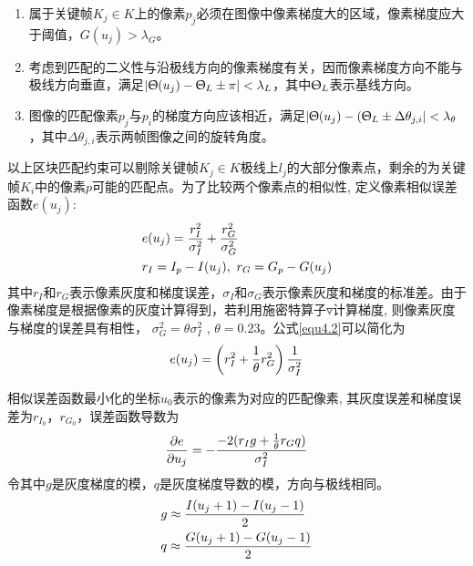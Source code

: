 \begin{enumerate}[label={(\arabic*)}]

\item 属于关键帧$K_j \in K$上的像素$p_j$必须在图像中像素梯度大的区域，像素梯度应大于阈值，$G(u_j)> \lambda_G$。

\item 考虑到匹配的二义性与沿极线方向的像素梯度有关，因而像素梯度方向不能与极线方向垂直，满足$\vert \Uptheta(u_j)-\Uptheta_L \pm \pi \vert < \lambda_L$，其中$\Uptheta_L$表示基线方向。

\item 图像的匹配像素$p_j$与$p_i$的梯度方向应该相近，满足$\vert \Uptheta(u_j)-(\Uptheta_L \pm \Delta \theta_{j,i} \vert < \lambda_\theta $，其中$\Delta \theta_{j,i}$表示两帧图像之间的旋转角度。

\end{enumerate}
以上区块匹配约束可以剔除关键帧$K_j \in K$极线上$l_j$的大部分像素点，剩余的为关键帧$K_i$中的像素$p$可能的匹配点。为了比较两个像素点的相似性, 定义像素相似误差函数$e(u_j)$:
\begin{equation}
\label{equ4.2}
\begin{aligned}
& e(u_j) = {r_I^2 \over \sigma_I^2} + {r_G^2 \over \sigma_G^2} \\ 
& r_I = I_p-I(u_j),\  r_G = G_p-G(u_j)
\end{aligned}
\end{equation}
其中$r_I$和$r_G$表示像素灰度和梯度误差，$\sigma_I$和$\sigma_G$表示像素灰度和梯度的标准差。由于像素梯度是根据像素的灰度计算得到，若利用施密特算子$\triangledown$计算梯度, 则像素灰度与梯度的误差具有相性，
$\sigma_G^2=\theta \sigma_I^2$ , $ \theta = 0.23$。公式\eqref{equ4.2}可以简化为
\begin{equation}
\label{equ4.3}
 e(u_j) = \left( {r_I^2}+{1 \over \theta} r_G^2 \right) {1 \over \sigma_I^2}
\end{equation} 

相似误差函数最小化的坐标$u_0$表示的像素为对应的匹配像素, 其灰度误差和梯度误差为$r_{I_0}$，$r_{G_0}$，误差函数导数为
\begin{equation}
\label{equ4.4}
{\partial e \over \partial u_j } = -{ -2(r_I g+ { 1 \over \theta} r_G q )  \over \sigma_I^2 }
\end{equation}
令其中$g$是灰度梯度的模，$q$是灰度梯度导数的模，方向与极线相同。
\begin{equation}
\label{equ4.5}
\begin{aligned}
& g \approx { {I(u_j+1) - I(u_j-1)} \over 2 } \\
& q \approx { {G(u_j+1) - G(u_j-1)} \over 2 } 
\end{aligned}
\end{equation}

